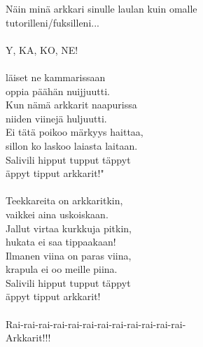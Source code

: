 
Näin minä arkkari sinulle laulan kuin omalle \\ tutorilleni/fuksilleni... \\ \hspace{10mm} \\ Y, KA, KO, NE! \\ \hspace{10mm} \\ \underline{\qquad}läiset ne kammarissaan \\ oppia päähän nuijjuutti. \\ Kun nämä arkkarit naapurissa \\ niiden viinejä huljuutti. \\ Ei tätä poikoo märkyys haittaa, \\ sillon ko laskoo laiasta laitaan. \\ Salivili hipput tupput täppyt \\ äppyt tipput arkkarit!" \\ \hspace{10mm} \\ Teekkareita on arkkaritkin, \\ vaikkei aina uskoiskaan. \\ Jallut virtaa kurkkuja pitkin, \\ hukata ei saa tippaakaan! \\ Ilmanen viina on paras viina, \\ krapula ei oo meille piina. \\ Salivili hipput tupput täppyt \\ äppyt tipput arkkarit! \\ \hspace{10mm} \\ Rai-rai-rai-rai-rai-rai-rai-rai-rai-rai-rai-rai- \\ Arkkarit!!!